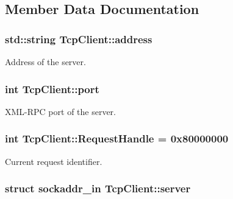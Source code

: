\subsection{Member Data Documentation}
\hypertarget{classTcpClient_a8bcb24ebf1d8e22e9185f3056fd108c4}{
\subsubsection[{address}]{\setlength{\rightskip}{0pt plus 5cm}std\-::string Tcp\-Client\-::address\hspace{0.3cm}{\ttfamily [private]}}}\label{classTcpClient_a8bcb24ebf1d8e22e9185f3056fd108c4}


Address of the server. 

\hypertarget{classTcpClient_aa112ef0470437e790931b3ec9c98a800}{
\subsubsection[{port}]{\setlength{\rightskip}{0pt plus 5cm}int Tcp\-Client\-::port\hspace{0.3cm}{\ttfamily [private]}}}\label{classTcpClient_aa112ef0470437e790931b3ec9c98a800}


X\-M\-L-\/\-R\-P\-C port of the server. 

\hypertarget{classTcpClient_ab2a93fc91ae8adf7c94e19651339f996}{
\subsubsection[{Request\-Handle}]{\setlength{\rightskip}{0pt plus 5cm}int Tcp\-Client\-::\-Request\-Handle = 0x80000000}}\label{classTcpClient_ab2a93fc91ae8adf7c94e19651339f996}


Current request identifier. 

\hypertarget{classTcpClient_a75a8bd28eca3f1eea17fb430ab14cade}{
\subsubsection[{server}]{\setlength{\rightskip}{0pt plus 5cm}struct sockaddr\-\_\-in Tcp\-Client\-::server\hspace{0.3cm}{\ttfamily [private]}}}\label{classTcpClient_a75a8bd28eca3f1eea17fb430ab14cade}


